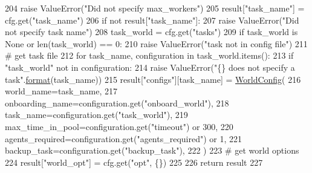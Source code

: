 \begin{DoxyCode}
204             \textcolor{keywordflow}{raise} ValueError(\textcolor{stringliteral}{"Did not specify max\_workers"})
205         result[\textcolor{stringliteral}{"task\_name"}] = cfg.get(\textcolor{stringliteral}{"task\_name"})
206         \textcolor{keywordflow}{if} \textcolor{keywordflow}{not} result[\textcolor{stringliteral}{"task\_name"}]:
207             \textcolor{keywordflow}{raise} ValueError(\textcolor{stringliteral}{"Did not specify task name"})
208         task\_world = cfg.get(\textcolor{stringliteral}{"tasks"})
209         \textcolor{keywordflow}{if} task\_world \textcolor{keywordflow}{is} \textcolor{keywordtype}{None} \textcolor{keywordflow}{or} len(task\_world) == 0:
210             \textcolor{keywordflow}{raise} ValueError(\textcolor{stringliteral}{"task not in config file"})
211         \textcolor{comment}{# get task file}
212         \textcolor{keywordflow}{for} task\_name, configuration \textcolor{keywordflow}{in} task\_world.items():
213             \textcolor{keywordflow}{if} \textcolor{stringliteral}{"task\_world"} \textcolor{keywordflow}{not} \textcolor{keywordflow}{in} configuration:
214                 \textcolor{keywordflow}{raise} ValueError(\textcolor{stringliteral}{"\{\} does not specify a task"}.\hyperlink{namespaceparlai_1_1mturk_1_1core_1_1shared__utils_a9cd2c4b48b3efc5296be64d403e00151}{format}(task\_name))
215             result[\textcolor{stringliteral}{"configs"}][task\_name] = \hyperlink{namespaceparlai_1_1chat__service_1_1services_1_1messenger_1_1shared__utils_a2fad0a70ab62b27b2692978de3a852f1}{WorldConfig}(
216                 world\_name=task\_name,
217                 onboarding\_name=configuration.get(\textcolor{stringliteral}{"onboard\_world"}),
218                 task\_name=configuration.get(\textcolor{stringliteral}{"task\_world"}),
219                 max\_time\_in\_pool=configuration.get(\textcolor{stringliteral}{"timeout"}) \textcolor{keywordflow}{or} 300,
220                 agents\_required=configuration.get(\textcolor{stringliteral}{"agents\_required"}) \textcolor{keywordflow}{or} 1,
221                 backup\_task=configuration.get(\textcolor{stringliteral}{"backup\_task"}),
222             )
223         \textcolor{comment}{# get world options}
224         result[\textcolor{stringliteral}{"world\_opt"}] = cfg.get(\textcolor{stringliteral}{"opt"}, \{\})
225 
226     \textcolor{keywordflow}{return} result
227 \end{DoxyCode}
\mbox{\label{namespaceparlai_1_1chat__service_1_1services_1_1messenger_1_1shared__utils_aec85b06c02b1d4c28a9a6bbcc5cdad1b}} 
